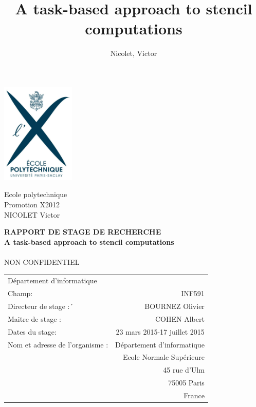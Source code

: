 \documentclass[a4paper,11pt]{article}
\title{A task-based approach to stencil computations}
\author{Nicolet, Victor}
\begin{document}
\begin{minipage}{3.5cm}
  \includegraphics[width=3.5cm]{logox.jpg}
  \begin{center}
  Ecole polytechnique\\
  Promotion X2012\\
  NICOLET Victor
  \end{center}
\end{minipage}

\vspace{3cm}

\begin{center}

{\Large \textbf{RAPPORT DE STAGE DE RECHERCHE}}\\
\vspace{1cm}
{\Large\textbf{A task-based approach to stencil computations}}\\
\makebox{\rule{12cm}{0.4pt}}\\
\vspace{1cm}
{\large NON CONFIDENTIEL}\\

\end{center}
\vspace{4cm}
\begin{tabular}{p{}r}
 D\'epartement d'informatique & \\
 Champ: & INF591 \\
 Directeur de stage :´& BOURNEZ Olivier \\
 Maitre de stage :& COHEN Albert \\
 Dates du stage: & 23 mars 2015-17 juillet 2015 \\
 Nom et adresse de l'organisme : & D\'epartement d'informatique \\
 & Ecole Normale Sup\'erieure \\
 & 45 rue d'Ulm \\
 & 75005 Paris \\
 & France
\end{tabular}

\clearpage
\newpage
\end{document}
